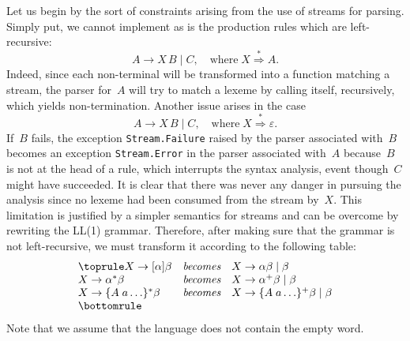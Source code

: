 Let us begin by the sort of constraints arising from the use of
streams for parsing. Simply put, we cannot implement as is the
production rules which are left\hyp{}recursive:
\begin{equation*}
A \rightarrow X \, B \mid C, \quad \text{where} \; X
\stackrel{*}{\Rightarrow} A.
\end{equation*}
Indeed, since each non\hyp{}terminal will be transformed into a
function matching a stream, the parser for~\(A\) will try to match a
lexeme by calling itself, recursively, which yields
non\hyp{}termination. Another issue arises in the case
\begin{equation*}
A \rightarrow X \, B \mid C, \quad \text{where} \; X
\stackrel{*}{\Rightarrow} \varepsilon.
\end{equation*}
If~\(B\) fails, the exception \texttt{Stream.Failure} raised by the
parser associated with~\(B\) becomes an exception
\texttt{Stream.Error} in the parser associated with~\(A\)
because~\(B\) is not at the head of a rule, which interrupts the
syntax analysis, event though~\(C\) might have succeeded. It is clear
that there was never any danger in pursuing the analysis since no
lexeme had been consumed from the stream by~\(X\). This limitation is
justified by a simpler semantics for streams and can be overcome by
rewriting the LL(1) grammar. Therefore, after making sure that the
grammar is not left\hyp{}recursive, we must transform it according to
the following table:
\begin{equation*}
\begin{array}{@{}lcl@{}}
\toprule
  X \rightarrow [\alpha] \beta
& \textit{becomes}
& X \rightarrow \alpha \beta \mid \beta\\
  X \rightarrow \alpha^* \beta
& \textit{becomes}
& X \rightarrow \alpha^+ \beta \mid \beta\\
  X \rightarrow \{A \; a \ldots\}^* \beta
& \textit{becomes}
& X \rightarrow \{A \; a \ldots\}^+ \beta \mid \beta\\
\bottomrule
\end{array}
\end{equation*}
Note that we assume that the language does not contain the empty word.

